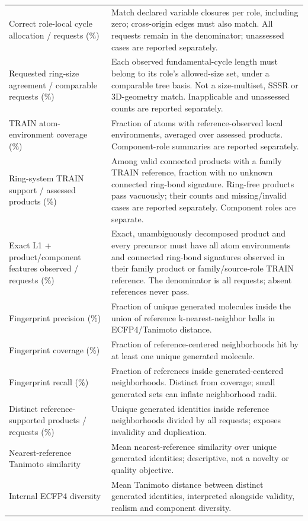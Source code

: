 \begin{longtable}{@{}>{\raggedright\arraybackslash}p{}>{\raggedright\arraybackslash}p{}@{}}
Correct role-local cycle allocation / requests (\%) & Match declared variable closures per role, including zero; cross-origin edges must also match. All requests remain in the denominator; unassessed cases are reported separately. \\[1.5pt]
Requested ring-size agreement / comparable requests (\%) & Each observed fundamental-cycle length must belong to its role's allowed-size set, under a comparable tree basis. Not a size-multiset, SSSR or 3D-geometry match. Inapplicable and unassessed counts are reported separately. \\[1.5pt]
TRAIN atom-environment coverage (\%) & Fraction of atoms with reference-observed local environments, averaged over assessed products. Component-role summaries are reported separately. \\[1.5pt]
Ring-system TRAIN support / assessed products (\%) & Among valid connected products with a family TRAIN reference, fraction with no unknown connected ring-bond signature. Ring-free products pass vacuously; their counts and missing/invalid cases are reported separately. Component roles are separate. \\[1.5pt]
Exact L1 + product/component features observed / requests (\%) & Exact, unambiguously decomposed product and every precursor must have all atom environments and connected ring-bond signatures observed in their family product or family/source-role TRAIN reference. The denominator is all requests; absent references never pass. \\[1.5pt]
Fingerprint precision (\%) & Fraction of unique generated molecules inside the union of reference k-nearest-neighbor balls in ECFP4/Tanimoto distance. \\[1.5pt]
Fingerprint coverage (\%) & Fraction of reference-centered neighborhoods hit by at least one unique generated molecule. \\[1.5pt]
Fingerprint recall (\%) & Fraction of references inside generated-centered neighborhoods. Distinct from coverage; small generated sets can inflate neighborhood radii. \\[1.5pt]
Distinct reference-supported products / requests (\%) & Unique generated identities inside reference neighborhoods divided by all requests; exposes invalidity and duplication. \\[1.5pt]
Nearest-reference Tanimoto similarity & Mean nearest-reference similarity over unique generated identities; descriptive, not a novelty or quality objective. \\[1.5pt]
Internal ECFP4 diversity & Mean Tanimoto distance between distinct generated identities, interpreted alongside validity, realism and component diversity. \\[1.5pt]

\end{longtable}
